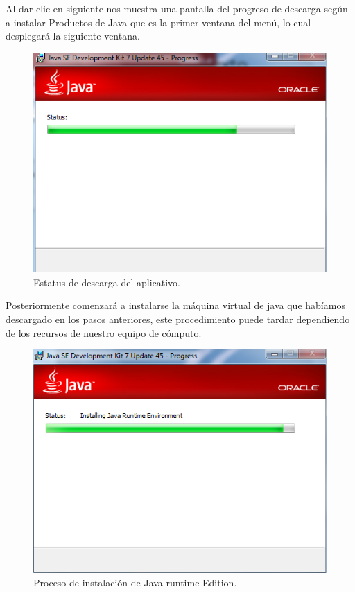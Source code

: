 Al dar clic en siguiente nos muestra una pantalla del progreso de
descarga según a instalar Productos de Java que es la primer ventana del menú,
lo cual desplegará la siguiente ventana.

\begin{figure}[H]
	\begin{center}
		\includegraphics[scale=.4]{images/instalaciones/java/img_java_5}
		\caption{Estatus de descarga del aplicativo.}
	\end{center}
\end{figure}

Posteriormente
comenzará a instalarse la máquina virtual de java que habíamos descargado en los
pasos anteriores, este procedimiento puede tardar dependiendo de los recursos de
nuestro equipo de cómputo.

\begin{figure}[H]
	\begin{center}
		\includegraphics[scale=.4]{images/instalaciones/java/img_java_6}
		\caption{Proceso de instalación de Java runtime Edition.}
	\end{center}
\end{figure} 

